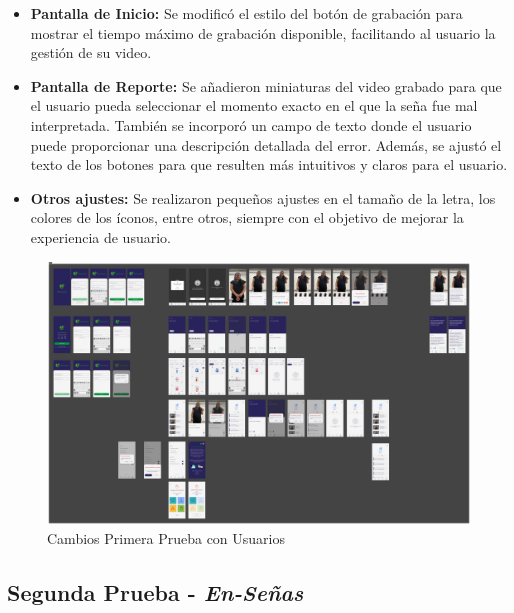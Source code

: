 \begin{itemize}
    \item \textbf{Pantalla de Inicio:} Se modificó el estilo del botón de grabación para mostrar el tiempo máximo de grabación disponible, facilitando al usuario la gestión de su video.
    
    \item \textbf{Pantalla de Reporte:} Se añadieron miniaturas del video grabado para que el usuario pueda seleccionar el momento exacto en el que la seña fue mal interpretada. También se incorporó un campo de texto donde el usuario puede proporcionar una descripción detallada del error. Además, se ajustó el texto de los botones para que resulten más intuitivos y claros para el usuario.
    
    \item \textbf{Otros ajustes:} Se realizaron pequeños ajustes en el tamaño de la letra, los colores de los íconos, entre otros, siempre con el objetivo de mejorar la experiencia de usuario.
\end{itemize}

\begin{figure} [H]
    \centering
    \includegraphics[width=1\linewidth]{figuras/prototipo_cambios1.png}
    \caption{Cambios Primera Prueba con Usuarios}
    \label{fig:enter-label}
\end{figure}


\subsection{Segunda Prueba - \textit{En-Señas}}


